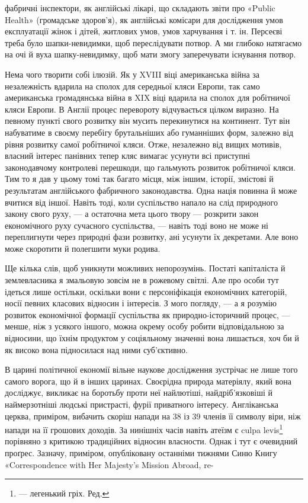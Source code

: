 фабричні інспектори, як англійські лікарі, що складають звіти
про «Public Health» (громадське здоров’я), як англійські комісари
для дослідження умов експлуатації жінок і дітей, житлових
умов, умов харчування і т. ін. Персеєві треба було шапки-невидимки,
щоб переслідувати потвор. А ми глибоко натягаємо на очі
й вуха шапку-невидимку, щоб мати змогу заперечувати існування
потвор.

Нема чого творити собі ілюзій. Як у XVIII віці американська
війна за незалежність вдарила на сполох для середньої кляси
Европи, так само американська громадянська війна в XIX віці
вдарила на сполох для робітничої кляси Европи. В Англії процес
перевороту відчувається цілком виразно. На певному пункті свого
розвитку він мусить перекинутися на континент. Тут він набуватиме
в своєму перебігу брутальніших або гуманніших форм, залежно
від рівня розвитку самої робітничої кляси. Отже, незалежно
від вищих мотивів, власний інтерес панівних тепер кляс вимагає
усунути всі приступні законодавчому контролеві перешкоди, що
гальмують розвиток робітничої кляси. Тим то я дав у цьому
томі так багато місця, між іншим, історії, змістові й результатам
англійського фабричного законодавства. Одна нація повинна й
може вчитися від іншої. Навіть тоді, коли суспільство напало на
слід природного закону свого руху, — а остаточна мета цього
твору — розкрити закон економічного руху сучасного суспільства,
— навіть тоді воно не може ні переплигнути через природні
фази розвитку, ані усунути їх декретами. Але воно може скоротити
й полегшити муки родива.

Ще кілька слів, щоб уникнути можливих непорозумінь. Постаті
капіталіста й землевласника я змальовую зовсім не в рожевому
світлі. Але про особи тут ідеться лише остільки, оскільки вони є
персоніфікація економічних категорій, носії певних класових
відносин і інтересів. З мого погляду, — а я розумію розвиток економічної
формації суспільства як природно-історичний процес, —
менше, ніж з усякого іншого, можна окрему особу робити відповідальною
за відносини, що їхнім продуктом у соціяльному значенні
вона лишається, хоч би й як високо вона підносилася над
ними суб’єктивно.

В царині політичної економії вільне наукове дослідження
зустрічає не лише того самого ворога, що й в інших царинах.
Своєрідна природа матеріялу, який вона досліджує, викликає на
боротьбу проти неї найлютіші, найдріб’язковіші й наймерзотніші
людські пристрасті, фурії приватного інтересу. Англіканська
церква, приміром, вибачить скоріш напади на 38 із 39 членів
її символу віри, ніж напади на  її грошових доходів. За нинішніх
часів навіть атеїзм є culpa levis\footnote*{
— легенький гріх. Ред.
} порівняно з критикою
традиційних відносин власности. Однак і тут є очевидний проґрес.
Зазначу, приміром, опубліковану останніми тижнями Синю
Книгу «Correspondence with Her Majesty’s Mission Abroad, re-